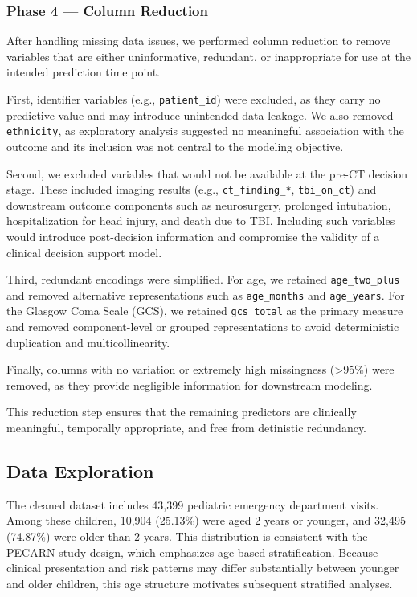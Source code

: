 \documentclass[11pt,letterpaper]{article}
\begin{document}
\subsubsection{Phase 4 — Column Reduction}\label{Phase 4 — Column Reduction}

After handling missing data issues,
we performed column reduction to remove variables that are either
uninformative, redundant, or inappropriate for use at the intended
prediction time point.

First, identifier variables (e.g., \texttt{patient\_id}) were excluded,
as they carry no predictive value and may introduce unintended data leakage.
We also removed \texttt{ethnicity}, as exploratory analysis suggested no
meaningful association with the outcome and its inclusion was not central
to the modeling objective.

Second, we excluded variables that would not be available at the
pre-CT decision stage. These included imaging results
(e.g., \texttt{ct\_finding\_*}, \texttt{tbi\_on\_ct}) and downstream
outcome components such as neurosurgery, prolonged intubation,
hospitalization for head injury, and death due to TBI.
Including such variables would introduce post-decision information
and compromise the validity of a clinical decision support model.

Third, redundant encodings were simplified.
For age, we retained \texttt{age\_two\_plus} and removed alternative
representations such as \texttt{age\_months} and \texttt{age\_years}.
For the Glasgow Coma Scale (GCS), we retained \texttt{gcs\_total}
as the primary measure and removed component-level or grouped
representations to avoid deterministic duplication and multicollinearity.

Finally, columns with no variation or extremely high missingness
(>95\%) were removed, as they provide negligible information
for downstream modeling.

This reduction step ensures that the remaining predictors are
clinically meaningful, temporally appropriate, and free from
detinistic redundancy.



\subsection{Data Exploration}\label{data-exploration}

The cleaned dataset includes 43,399 pediatric emergency department visits. Among these children, 10,904 (25.13\%) were aged 2 years or younger, and 32,495 (74.87\%) were older than 2 years. This distribution is consistent with the PECARN study design, which emphasizes age-based stratification. Because clinical presentation and risk patterns may differ substantially between younger and older children, this age structure motivates subsequent stratified analyses.
\end{document}
